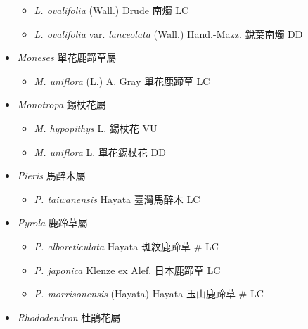 \begin{itemize}
  \begin{itemize}
        \item[] \textit{L. ovalifolia} (Wall.) Drude  南燭   LC
        \item[] \textit{L. ovalifolia} var. \textit{lanceolata} (Wall.) Hand.-Mazz.  銳葉南燭   DD
  \end{itemize}
 \item[] \textit{Moneses} 單花鹿蹄草屬
                                
  \begin{itemize}
        \item[] \textit{M. uniflora} (L.) A. Gray  單花鹿蹄草   LC
  \end{itemize}
 \item[] \textit{Monotropa} 錫杖花屬
                                
  \begin{itemize}
        \item[] \textit{M. hypopithys} L.  錫杖花   VU
        \item[] \textit{M. uniflora} L.  單花錫杖花   DD
  \end{itemize}
 \item[] \textit{Pieris} 馬醉木屬
                                
  \begin{itemize}
        \item[] \textit{P. taiwanensis} Hayata  臺灣馬醉木   LC
  \end{itemize}
 \item[] \textit{Pyrola} 鹿蹄草屬
                                
  \begin{itemize}
        \item[] \textit{P. alboreticulata} Hayata  斑紋鹿蹄草  \# LC
        \item[] \textit{P. japonica} Klenze ex Alef.  日本鹿蹄草   LC
        \item[] \textit{P. morrisonensis} (Hayata) Hayata  玉山鹿蹄草  \# LC
  \end{itemize}
 \item[] \textit{Rhododendron} 杜鵑花屬
                                

\end{itemize}
